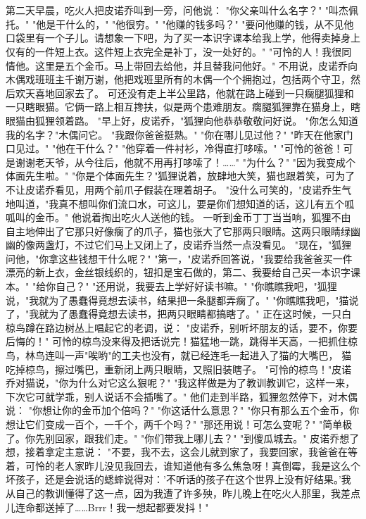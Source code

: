 \documentclass[12pt,UTF8]{ctexbook}
\begin{document}
\chapter{}

第二天早晨，吃火人把皮诺乔叫到一旁，问他说：
"你父亲叫什么名字？"
"叫杰佩托。"
"他是干什么的，"
"他很穷。"
"他赚的钱多吗？"
"要问他赚的钱，从不见他口袋里有一个子儿。请想象一下吧，为了买一本识字课本给我上学，他得卖掉身上仅有的一件短上衣。这件短上衣完全是补丁，没一处好的。"
"可怜的人！我很同情他。这里是五个金币。马上带回去给他，并且替我问他好。"
不用说，皮诺乔向木偶戏班班主千谢万谢，他把戏班里所有的木偶一个个拥抱过，包括两个守卫，然后欢天喜地回家去了。
可还没有走上半公里路，他就在路上碰到一只瘸腿狐狸和一只瞎眼猫。它俩一路上相互搀扶，似是两个患难朋友。瘸腿狐狸靠在猫身上，瞎眼猫由狐狸领着路。
"早上好，皮诺乔，"狐狸向他恭恭敬敬问好说。
"你怎么知道我的名字？"木偶问它。
"我跟你爸爸挺熟。"
"你在哪儿见过他？"
"昨天在他家门口见过。"
"他在干什么？"
"他穿着一件衬衫，冷得直打哆嗦。"
"可怜的爸爸！可是谢谢老天爷，从今往后，他就不用再打哆嗦了！……"
"为什么？"
"因为我变成个体面先生啦。"
"你是个体面先生？"狐狸说着，放肆地大笑，猫也跟着笑，可为了不让皮诺乔看见，用两个前爪子假装在理着胡子。
"没什么可笑的，"皮诺乔生气地叫道，"我真不想叫你们流口水，可这儿，要是你们想知道的话，这儿有五个呱呱叫的金币。"
他说着掏出吃火人送他的钱。
一听到金币丁丁当当响，狐狸不由自主地伸出了它那只好像瘸了的爪子，猫也张大了它那两只眼睛。这两只眼睛绿幽幽的像两盏灯，不过它们马上又闭上了，皮诺乔当然一点没看见。
"现在，"狐狸问他，"你拿这些钱想干什么呢？"
"第一，"皮诺乔回答说，"我要给我爸爸买一件漂亮的新上衣，金丝银线织的，钮扣是宝石做的，第二、我要给自己买一本识字课本。"
"给你自己？"
"还用说，我要去上学好好读书嘛。"
"你瞧瞧我吧，"狐狸说，"我就为了愚蠢得竟想去读书，结果把一条腿都弄瘸了。"
"你瞧瞧我吧，"猫说了，"我就为了愚蠢得竟想去读书，把两只眼睛都搞瞎了。"
正在这时候，一只白椋鸟蹲在路边树丛上唱起它的老调，说：
"皮诺乔，别听坏朋友的话，要不，你要后悔的！"
可怜的椋鸟没来得及把话说完！猫猛地一跳，跳得半天高，一把抓住椋鸟，林鸟连叫一声"唉哟"的工夫也没有，就已经连毛一起进入了猫的大嘴巴，
猫吃掉椋鸟，擦过嘴巴，重新闭上两只眼睛，又照旧装瞎子。
"可怜的椋鸟！"皮诺乔对猫说，"你为什么对它这么狠呢？"
"我这样做是为了教训教训它，这样一来，下次它可就学乖，别人说话不会插嘴了。"
他们走到半路，狐狸忽然停下，对木偶说：
"你想让你的金币加个倍吗？"
"你这话什么意思？"
"你只有那么五个金币，你想让它们变成一百个，一千个，两千个吗？"
"那还用说！可怎么变呢？"
"简单极了。你先别回家，跟我们走。"
"你们带我上哪儿去？"
"到傻瓜城去。"
皮诺乔想了想，接着拿定主意说：
"不要，我不去，这会儿就到家了，我要回家，我爸爸在等着，可怜的老人家昨儿没见我回去，谁知道他有多么焦急呀！真倒霉，我是这么个坏孩子，还是会说话的蟋蟀说得对：'不听话的孩子在这个世界上没有好结果。'我从自己的教训懂得了这一点，因为我遭了许多殃，昨儿晚上在吃火人那里，我差点儿连命都送掉了……Brrr！我一想起都要发抖！"
\end{document}
